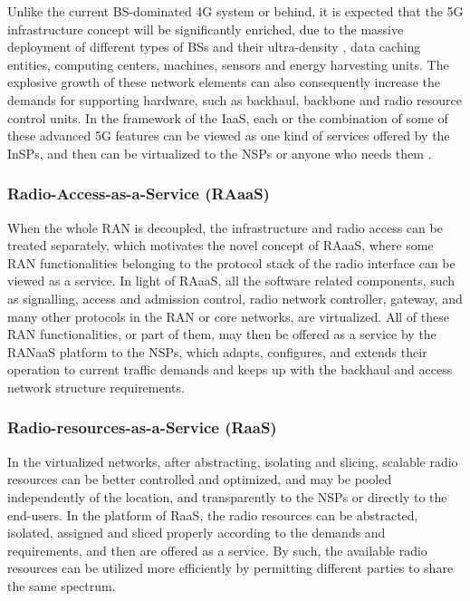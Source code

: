 \documentclass[12pt,draftclsnofoot,onecolumn]{IEEEtran}
\begin{document}
Unlike the current BS-dominated 4G system or behind, it is
expected that the 5G infrastructure concept will be significantly
enriched, due to the massive deployment of different types of BSs
and their ultra-density \cite{Chang1}, data caching entities,
computing centers, machines, sensors and energy harvesting units.
The explosive growth of these network elements can also
consequently increase the demands for supporting hardware, such as
backhaul, backbone and radio resource control units. In the
framework of the IaaS, each or the combination of some of these
advanced 5G features can be viewed as one kind of services offered
by the InSPs, and then can be virtualized to the NSPs or anyone
who needs them \cite{Trakas}.

\subsubsection{Radio-Access-as-a-Service (RAaaS)}
When the whole RAN is decoupled, the infrastructure and radio
access can be treated separately, which motivates the novel
concept of RAaaS, where some RAN functionalities belonging to the
protocol stack of the radio interface can be viewed as a service.
In light of RAaaS, all the software related components, such as
signalling, access and admission control, radio network
controller, gateway, and many other protocols in the RAN or core
networks, are virtualized. All of these RAN functionalities, or
part of them, may then be offered as a service by the RANaaS
platform to the NSPs, which adapts, configures, and extends their
operation to current traffic demands and keeps up with the
backhaul and access network structure requirements. \par

\subsubsection{Radio-resources-as-a-Service (RaaS)}
In the virtualized networks, after abstracting,
isolating and slicing, scalable radio resources can be better
controlled and optimized, and may be pooled independently of the
location, and transparently to the NSPs or directly to the
end-users. In the platform of RaaS, the radio resources can be
abstracted, isolated, assigned and sliced properly according to
the demands and requirements, and then are offered as a service.
By such, the available radio resources can be utilized more
efficiently by permitting different parties to share the same
spectrum.
\end{document}
